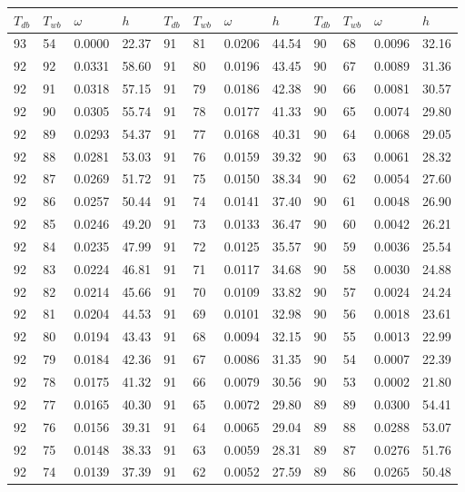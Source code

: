 \begin{tabular}{llll|llll|llll}
 \toprule 
\(T_{db}\) & \(T_{wb}\) & \(\omega\) & \(h\) & \(T_{db}\) & \(T_{wb}\) & \(\omega\) & \(h\) & \(T_{db}\) & \(T_{wb}\) & \(\omega\) & \(h\)  \\ \midrule 
93 & 54 & 0.0000 & 22.37 & 91 & 81 & 0.0206 & 44.54 & 90 & 68 & 0.0096 & 32.16\\
92 & 92 & 0.0331 & 58.60 & 91 & 80 & 0.0196 & 43.45 & 90 & 67 & 0.0089 & 31.36\\
92 & 91 & 0.0318 & 57.15 & 91 & 79 & 0.0186 & 42.38 & 90 & 66 & 0.0081 & 30.57\\
92 & 90 & 0.0305 & 55.74 & 91 & 78 & 0.0177 & 41.33 & 90 & 65 & 0.0074 & 29.80\\
92 & 89 & 0.0293 & 54.37 & 91 & 77 & 0.0168 & 40.31 & 90 & 64 & 0.0068 & 29.05\\
92 & 88 & 0.0281 & 53.03 & 91 & 76 & 0.0159 & 39.32 & 90 & 63 & 0.0061 & 28.32\\
92 & 87 & 0.0269 & 51.72 & 91 & 75 & 0.0150 & 38.34 & 90 & 62 & 0.0054 & 27.60\\
92 & 86 & 0.0257 & 50.44 & 91 & 74 & 0.0141 & 37.40 & 90 & 61 & 0.0048 & 26.90\\
92 & 85 & 0.0246 & 49.20 & 91 & 73 & 0.0133 & 36.47 & 90 & 60 & 0.0042 & 26.21\\
92 & 84 & 0.0235 & 47.99 & 91 & 72 & 0.0125 & 35.57 & 90 & 59 & 0.0036 & 25.54\\
92 & 83 & 0.0224 & 46.81 & 91 & 71 & 0.0117 & 34.68 & 90 & 58 & 0.0030 & 24.88\\
92 & 82 & 0.0214 & 45.66 & 91 & 70 & 0.0109 & 33.82 & 90 & 57 & 0.0024 & 24.24\\
92 & 81 & 0.0204 & 44.53 & 91 & 69 & 0.0101 & 32.98 & 90 & 56 & 0.0018 & 23.61\\
92 & 80 & 0.0194 & 43.43 & 91 & 68 & 0.0094 & 32.15 & 90 & 55 & 0.0013 & 22.99\\
92 & 79 & 0.0184 & 42.36 & 91 & 67 & 0.0086 & 31.35 & 90 & 54 & 0.0007 & 22.39\\
92 & 78 & 0.0175 & 41.32 & 91 & 66 & 0.0079 & 30.56 & 90 & 53 & 0.0002 & 21.80\\
92 & 77 & 0.0165 & 40.30 & 91 & 65 & 0.0072 & 29.80 & 89 & 89 & 0.0300 & 54.41\\
92 & 76 & 0.0156 & 39.31 & 91 & 64 & 0.0065 & 29.04 & 89 & 88 & 0.0288 & 53.07\\
92 & 75 & 0.0148 & 38.33 & 91 & 63 & 0.0059 & 28.31 & 89 & 87 & 0.0276 & 51.76\\
92 & 74 & 0.0139 & 37.39 & 91 & 62 & 0.0052 & 27.59 & 89 & 86 & 0.0265 & 50.48\\

\end{tabular}
